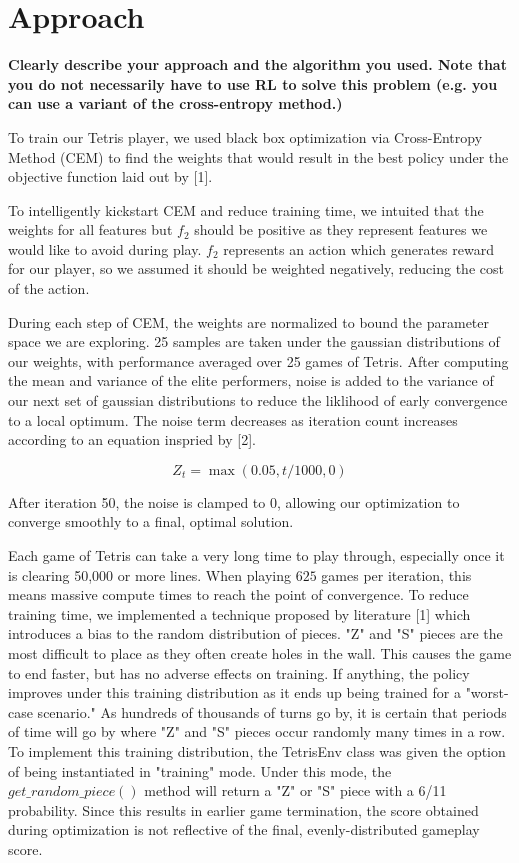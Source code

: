 \documentclass[12pt,letterpaper]{article}
\begin{document}
\section{Approach}
\textbf{Clearly describe your approach and the algorithm you used. Note that you do not necessarily have to use RL to solve this problem (e.g. you can use a variant of the cross-entropy method.)}

To train our Tetris player, we used black box optimization via Cross-Entropy Method (CEM) to find the weights that would result in the best policy under the objective function laid out by [1].

To intelligently kickstart CEM and reduce training time, we intuited that the weights for all features but $f_2$ should be positive as they represent features we would like to avoid during play. $f_2$ represents an action which generates reward for our player, so we assumed it should be weighted negatively, reducing the cost of the action.

During each step of CEM, the weights are normalized to bound the parameter space we are exploring. 25 samples are taken under the gaussian distributions of our weights, with performance averaged over 25 games of Tetris. After computing the mean and variance of the elite performers, noise is added to the variance of our next set of gaussian distributions to reduce the liklihood of early convergence to a local optimum. The noise term decreases as iteration count increases according to an equation inspried by [2].

\[Z_t = \max(0.05, t/1000,0)\]

After iteration 50, the noise is clamped to 0, allowing our optimization to converge smoothly to a final, optimal solution.

Each game of Tetris can take a very long time to play through, especially once it is clearing 50,000 or more lines. When playing $625$ games per iteration, this means massive compute times to reach the point of convergence. To reduce training time, we implemented a technique proposed by literature [1] which introduces a bias to the random distribution of pieces. "Z" and "S" pieces are the most difficult to place as they often create holes in the wall. This causes the game to end faster, but has no adverse effects on training. If anything, the policy improves under this training distribution as it ends up being trained for a "worst-case scenario." As hundreds of thousands of turns go by, it is certain that periods of time will go by where "Z" and "S" pieces occur randomly many times in a row. To implement this training distribution, the TetrisEnv class was given the option of being instantiated in "training" mode. Under this mode, the $get\_random\_piece()$ method will return a "Z" or "S" piece with a 6/11 probability. Since this results in earlier game termination, the score obtained during optimization is not reflective of the final, evenly-distributed gameplay score.
\end{document}
